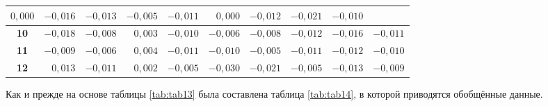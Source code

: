 \begin{table} [htbp]
{\begin{tabular}{|c|rrr|rrr|rrr|}
			\multicolumn{1}{r|}{$ 0,000$}       & \multicolumn{1}{r|}{$-0,016$}       & $-0,013$                            & \multicolumn{1}{r|}{$-0,005$}       & \multicolumn{1}{r|}{$-0,011$}       & $ 0,000$                            & \multicolumn{1}{r|}{$-0,012$}       & \multicolumn{1}{r|}{$-0,021$}       & $-0,010$                            \\ \hline
			\textbf{10}                 		& 
			\multicolumn{1}{r|}{$-0,018$}       & \multicolumn{1}{r|}{$-0,008$}       & $ 0,003$                            & \multicolumn{1}{r|}{$-0,010$}       & \multicolumn{1}{r|}{$-0,006$}       & $-0,008$                            & \multicolumn{1}{r|}{$-0,012$}       & \multicolumn{1}{r|}{$-0,016$}       & $-0,011$                            \\ \hline
			\textbf{11}                 		& 
			\multicolumn{1}{r|}{$-0,009$}       & \multicolumn{1}{r|}{$-0,006$}       & $ 0,004$                            & \multicolumn{1}{r|}{$-0,011$}       & \multicolumn{1}{r|}{$-0,010$}       & $-0,005$                            & \multicolumn{1}{r|}{$-0,011$}       & \multicolumn{1}{r|}{$-0,012$}       & $-0,010$                            \\ \hline
			\textbf{12}                 		& 
			\multicolumn{1}{r|}{$ 0,013$}       & \multicolumn{1}{r|}{$-0,011$}       & $ 0,002$                            & \multicolumn{1}{r|}{$-0,005$}       & \multicolumn{1}{r|}{$-0,030$}       & $-0,021$                            & \multicolumn{1}{r|}{$-0,005$}       & \multicolumn{1}{r|}{$-0,013$}       & $-0,009$                            \\ \hline
		\end{tabular}
	}
\end{table}

Как и прежде на основе таблицы \cref{tab:tab13} была составлена таблица \cref{tab:tab14}, в которой приводятся обобщённые данные.

